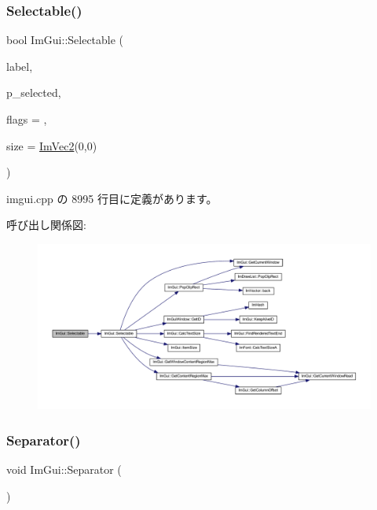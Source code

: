 \subsubsection{\texorpdfstring{Selectable()}{Selectable()}\hspace{0.1cm}{\footnotesize\ttfamily [2/2]}}
{\footnotesize\ttfamily bool Im\+Gui\+::\+Selectable (\begin{DoxyParamCaption}\item[{const char $\ast$}]{label,  }\item[{bool $\ast$}]{p\+\_\+selected,  }\item[{\mbox{\hyperlink{imgui_8h_aab0fe56421d75949dedfbfbbaa674b6b}{Im\+Gui\+Selectable\+Flags}}}]{flags = {},  }\item[{const \mbox{\hyperlink{struct_im_vec2}{Im\+Vec2}} \&}]{size = {\ttfamily \mbox{\hyperlink{struct_im_vec2}{Im\+Vec2}}(0,0)} }\end{DoxyParamCaption})}



 imgui.\+cpp の 8995 行目に定義があります。

呼び出し関係図\+:\nopagebreak
\begin{figure}[H]
\begin{center}
\leavevmode
\includegraphics[width=350pt]{namespace_im_gui_a9229a9c3c304ffc0c98ffe2ee4ff5e40_cgraph}
\end{center}
\end{figure}
\mbox{\label{namespace_im_gui_a191123597a5084d003c8beac7eeb029e}} 
\subsubsection{\texorpdfstring{Separator()}{Separator()}}
{\footnotesize\ttfamily void Im\+Gui\+::\+Separator (\begin{DoxyParamCaption}{ }\end{DoxyParamCaption})}



